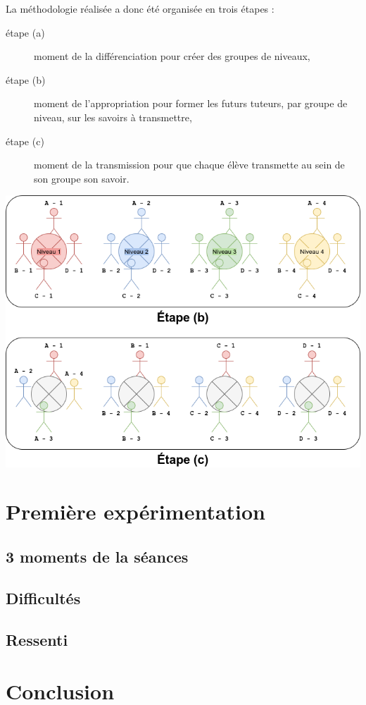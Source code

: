 La méthodologie réalisée a donc été organisée en trois étapes :

\begin{description}
    \item[étape (a)] moment de la différenciation pour créer des groupes de niveaux,
    \item[étape (b)] moment de l'appropriation pour former les futurs tuteurs, par groupe de niveau, sur les savoirs à transmettre,
    \item[étape (c)] moment de la transmission pour que chaque élève transmette au sein de son groupe son savoir.
\end{description}


\begin{center}
    \includegraphics[width=0.5\linewidth]{res/diagramme.drawio.png}
\end{center}




\section{Première expérimentation}

\subsection{3 moments de la séances}

\subsection{Difficultés}

\subsection{Ressenti}

\section{Conclusion}